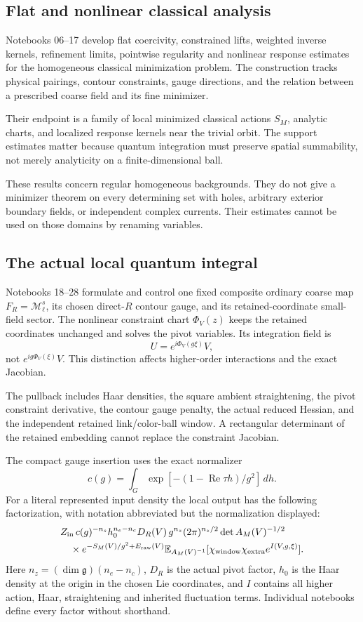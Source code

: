\subsection{Flat and nonlinear classical analysis}

Notebooks 06--17 develop flat coercivity, constrained lifts,
weighted inverse kernels, refinement limits, pointwise regularity
and nonlinear response estimates for the homogeneous classical
minimization problem. The construction tracks physical pairings,
contour constraints, gauge directions, and the relation between
a prescribed coarse field and its fine minimizer.

Their endpoint is a family of local minimized classical actions
\(S_M\), analytic charts, and localized response kernels near
the trivial orbit. The support estimates matter because quantum
integration must preserve spatial summability, not merely
analyticity on a finite-dimensional ball.

These results concern regular homogeneous backgrounds. They do
not give a minimizer theorem on every determining set with
holes, arbitrary exterior boundary fields, or independent
complex currents. Their estimates cannot be used on those
domains by renaming variables.

\subsection{The actual local quantum integral}

Notebooks 18--28 formulate and control one fixed composite
ordinary coarse map \(F_R=\mathcal M_\ell^s\), its chosen
direct-\(R\) contour gauge, and its retained-coordinate
small-field sector. The nonlinear constraint chart
\(\Phi_V(z)\) keeps the retained coordinates unchanged and
solves the pivot variables. Its integration field is
\[
                 U=e^{i\Phi_V(g\xi)}V,
\]
not \(e^{ig\Phi_V(\xi)}V\). This distinction affects
higher-order interactions and the exact Jacobian.

The pullback includes Haar densities, the square ambient
straightening, the pivot constraint derivative, the contour
gauge penalty, the actual reduced Hessian, and the independent
retained link/color-ball window. A rectangular determinant of
the retained embedding cannot replace the constraint Jacobian.

The compact gauge insertion uses the exact normalizer
\[
 c(g)=\int_G\exp[-(1-\operatorname{Re}\tau h)/g^2]\,dh.
\]
For a literal represented input density the local output
has the following factorization, with notation abbreviated
but the normalization displayed:
\begin{align*}
 &Z_{\rm in}\,c(g)^{-n_s}h_0^{n_e-n_c}D_R(V)\,
 g^{n_z}(2\pi)^{n_z/2}\det A_M(V)^{-1/2}\\
 &\quad{}\times e^{-S_M(V)/g^2+E_{\rm raw}(V)}
 \mathbb E_{A_M(V)^{-1}}
       [\chi_{\rm window}\chi_{\rm extra}e^{I(V,g,\xi)}].
\end{align*}
Here \(n_z=(\dim\mathfrak g)(n_e-n_c)\), \(D_R\) is the
actual pivot factor, \(h_0\) is the Haar density at the origin
in the chosen Lie coordinates, and \(I\) contains all higher
action, Haar, straightening and inherited fluctuation terms.
Individual notebooks define every factor without shorthand.

